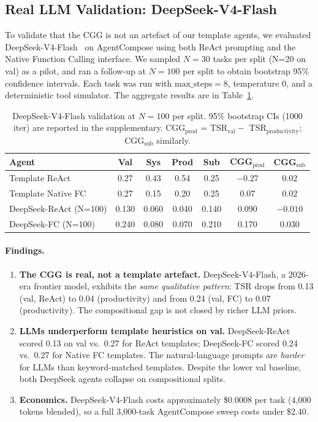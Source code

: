 \documentclass[10pt]{article}
\begin{document}
\subsection{Real LLM Validation: DeepSeek-V4-Flash}

To validate that the CGG is not an artefact of our template agents, we evaluated DeepSeek-V4-Flash~\citep{deepseek2024v3} on AgentCompose using both ReAct prompting and the Native Function Calling interface. We sampled $N{=}30$ tasks per split (N=20 on val) as a pilot, and ran a follow-up at $N{=}100$ per split to obtain bootstrap 95\% confidence intervals. Each task was run with $\text{max\_steps}{=}8$, temperature $0$, and a deterministic tool simulator. The aggregate results are in Table~\ref{tab:llm}.

\begin{table}[h]
    \centering
    \small
    \begin{tabular}{lcccccc}
        \toprule
        Agent & Val & Sys & Prod & Sub & CGG$_{\text{prod}}$ & CGG$_{\text{sub}}$ \\
        \midrule
        Template ReAct       & 0.27 & 0.43 & 0.54 & 0.25 & $-0.27$ & 0.02 \\
        Template Native FC   & 0.27 & 0.15 & 0.20 & 0.25 & 0.07 & 0.02 \\
        \midrule
        DeepSeek-ReAct (N=100)      & 0.130 & 0.060 & 0.040 & 0.140 & 0.090 & $-0.010$ \\
        DeepSeek-FC (N=100)         & 0.240 & 0.080 & 0.070 & 0.210 & 0.170 & 0.030 \\
        \bottomrule
    \end{tabular}
    \caption{DeepSeek-V4-Flash validation at $N{=}100$ per split. 95\% bootstrap CIs (1000 iter) are reported in the supplementary. CGG$_{\text{prod}}$ = TSR$_{\text{val}} -$ TSR$_{\text{productivity}}$; CGG$_{\text{sub}}$ similarly.}
    \label{tab:llm}
\end{table}

\paragraph{Findings.}
\begin{enumerate}
    \item \textbf{The CGG is real, not a template artefact.} DeepSeek-V4-Flash, a 2026-era frontier model, exhibits the \emph{same qualitative pattern}: TSR drops from 0.13 (val, ReAct) to 0.04 (productivity) and from 0.24 (val, FC) to 0.07 (productivity). The compositional gap is not closed by richer LLM priors.
    \item \textbf{LLMs underperform template heuristics on val.} DeepSeek-ReAct scored 0.13 on val vs.\ 0.27 for ReAct templates; DeepSeek-FC scored 0.24 vs.\ 0.27 for Native FC templates. The natural-language prompts are \emph{harder} for LLMs than keyword-matched templates. Despite the lower val baseline, both DeepSeek agents collapse on compositional splits.
    \item \textbf{Economics.} DeepSeek-V4-Flash costs approximately \$0.0008 per task (4{,}000 tokens blended), so a full 3{,}000-task AgentCompose sweep costs under \$2.40.
\end{enumerate}
\end{document}
